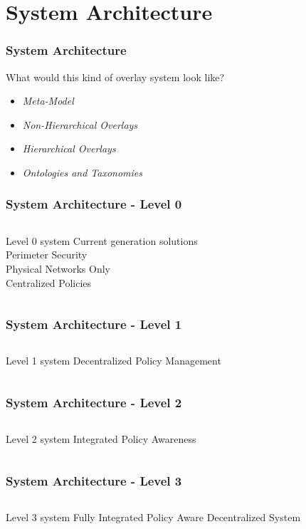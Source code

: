 \section{System Architecture}
\begin{frame}
\frametitle{System Architecture}
What would this kind of overlay system look like?
\begin{itemize}
\item<2-> \textit{Meta-Model}
\item<3-> \textit{Non-Hierarchical Overlays}
\item<4-> \textit{Hierarchical Overlays}
\item<5-> \textit{Ontologies and Taxonomies}
\end{itemize}
\end{frame}

\begin{frame}[t]
\frametitle{System Architecture - Level 0}
\begin{columns}[t]
Level 0 system 
Current generation solutions \\
Perimeter Security \\
Physical Networks Only \\
Centralized Policies
\end{columns}
\end{frame}

\begin{frame}[t]
\frametitle{System Architecture - Level 1}
\begin{columns}[t]
Level 1 system 
Decentralized Policy Management
\end{columns}
\end{frame}

\begin{frame}[t]
\frametitle{System Architecture - Level 2}
\begin{columns}[t]
Level 2 system 
Integrated Policy Awareness
\end{columns}
\end{frame}

\begin{frame}[t]
\frametitle{System Architecture - Level 3}
\begin{columns}[t]
Level 3 system 
Fully Integrated Policy Aware Decentralized System
\end{columns}
\end{frame}